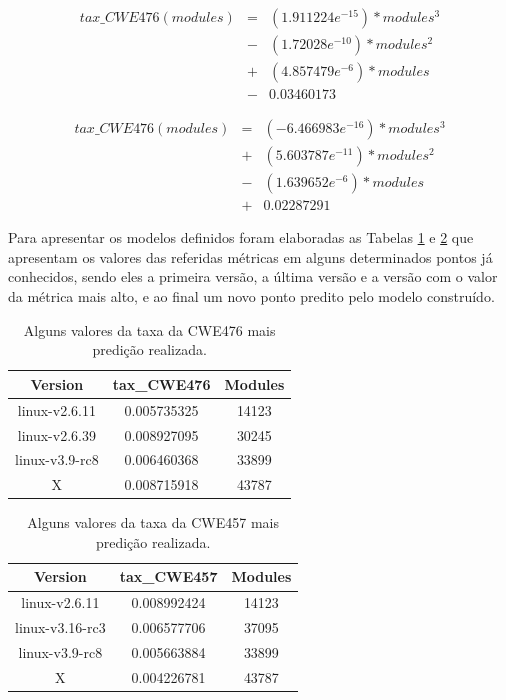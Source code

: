 \begin{align*}
 tax\_CWE476(modules) &=& (1.911224e^{-15}) * modules^{3} \\
                      &-& (1.72028e^{-10}) * modules^{2} \\
                      &+& (4.857479e^{-6}) * modules \\
                      &-& 0.03460173
\end{align*}

\begin{align*}
 tax\_CWE476(modules) &=& (-6.466983e^{-16}) * modules^{3} \\
                      &+& (5.603787e^{-11}) * modules^{2} \\
                      &-& (1.639652e^{-6}) * modules \\
                      &+& 0.02287291
\end{align*}

Para apresentar os modelos definidos foram elaboradas as Tabelas
\ref{tab:cwe476} e \ref{tab:cwe457} que apresentam os valores das referidas
métricas em alguns determinados pontos já conhecidos, sendo eles a primeira
versão, a última versão e a versão com o valor da métrica mais alto, e ao final
um novo ponto predito pelo modelo construído.

\begin{table}[h]
\centering
\begin{tabular}{ccc}
\hline
\rowcolor[HTML]{EFEFEF} 
{Version}  & {tax\_CWE476} & {Modules} \\ \hline
linux-v2.6.11  & 0.005735325       & 14123         \\ \hline
linux-v2.6.39  & 0.008927095       & 30245         \\ \hline
linux-v3.9-rc8 & 0.006460368       & 33899         \\ \hline
X              & 0.008715918       & 43787         \\ \hline
\end{tabular}
\caption{Alguns valores da taxa da CWE476 mais predição realizada.}
\label{tab:cwe476}
\end{table}

\begin{table}[h]
\centering
\begin{tabular}{ccc}
\hline
\rowcolor[HTML]{EFEFEF} 
{Version}   & {tax\_CWE457} & {Modules} \\ \hline
linux-v2.6.11   & 0.008992424       & 14123         \\ \hline
linux-v3.16-rc3 & 0.006577706       & 37095         \\ \hline
linux-v3.9-rc8  & 0.005663884       & 33899         \\ \hline
X               & 0.004226781       & 43787         \\ \hline
\end{tabular}
\caption{Alguns valores da taxa da CWE457 mais predição realizada.}
\label{tab:cwe457}
\end{table}

